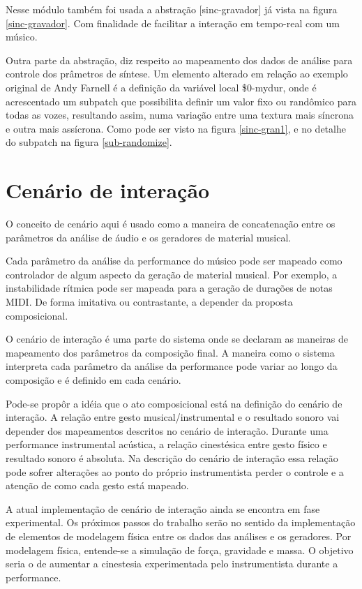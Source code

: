\documentclass{ppgmus}
\begin{document}
Nesse módulo também foi usada a abstração [sinc-gravador] já vista na figura \ref{sinc-gravador}.
Com finalidade de facilitar a interação em tempo-real com um músico.

Outra parte da abstração, diz respeito ao mapeamento dos dados de análise para controle
dos prâmetros de síntese. Um elemento alterado em relação ao exemplo original de Andy
Farnell é a definição da variável local \$0-mydur, onde é acrescentado um subpatch que 
possibilita definir um valor fixo ou randômico para todas as vozes, resultando assim, numa variação entre
uma textura mais síncrona e outra mais assícrona. Como pode ser visto na figura \ref{sinc-gran1},
e no detalhe do subpatch na figura \ref{sub-randomize}.


\pagebreak

\section{Cenário de interação}


O conceito de cenário aqui é usado como a maneira de concatenação
entre os parâmetros da análise de áudio e os geradores de material
musical.


Cada parâmetro da análise da performance do músico pode ser mapeado como controlador
de algum aspecto da geração de material musical. Por exemplo,
a instabilidade rítmica pode ser mapeada para a geração de durações
de notas MIDI. De forma imitativa ou contrastante, a depender da
proposta composicional.

O cenário de interação é uma parte do sistema onde se declaram
as maneiras de mapeamento dos parâmetros da composição final. A maneira
como o sistema interpreta cada parâmetro da análise da performance pode
variar ao longo da composição e é definido em cada cenário.

Pode-se propôr a idéia que o ato composicional está na definição
do cenário de interação. A relação entre gesto musical/instrumental e 
o resultado sonoro vai depender dos mapeamentos descritos no cenário
de interação. Durante uma performance instrumental acústica, a relação
cinestésica entre gesto físico e resultado sonoro é absoluta. Na descrição
do cenário de interação essa relação pode sofrer alterações ao ponto
do próprio instrumentista perder o controle e a atenção de como cada
gesto está mapeado.

A atual implementação de cenário de interação ainda se encontra em fase 
experimental. Os próximos passos do trabalho serão no sentido da implementação
de elementos de modelagem física entre os dados das análises e os geradores.
Por modelagem física, entende-se a simulação de força, gravidade e massa. O 
objetivo seria o de aumentar a cinestesia experimentada pelo instrumentista 
durante a performance.
\end{document}
